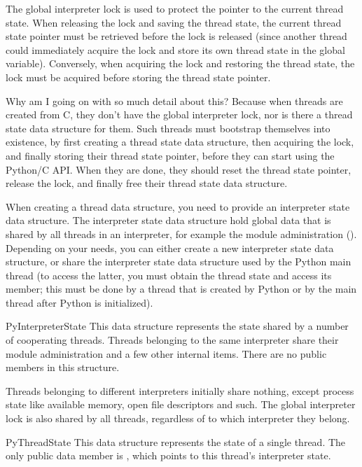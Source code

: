 \documentclass{manual}
\begin{document}
The global interpreter lock is used to protect the pointer to the
current thread state.  When releasing the lock and saving the thread
state, the current thread state pointer must be retrieved before the
lock is released (since another thread could immediately acquire the
lock and store its own thread state in the global variable).
Conversely, when acquiring the lock and restoring the thread state,
the lock must be acquired before storing the thread state pointer.

Why am I going on with so much detail about this?  Because when
threads are created from C, they don't have the global interpreter
lock, nor is there a thread state data structure for them.  Such
threads must bootstrap themselves into existence, by first creating a
thread state data structure, then acquiring the lock, and finally
storing their thread state pointer, before they can start using the
Python/C API.  When they are done, they should reset the thread state
pointer, release the lock, and finally free their thread state data
structure.

When creating a thread data structure, you need to provide an
interpreter state data structure.  The interpreter state data
structure hold global data that is shared by all threads in an
interpreter, for example the module administration
().  Depending on your needs, you can either create
a new interpreter state data structure, or share the interpreter state
data structure used by the Python main thread (to access the latter,
you must obtain the thread state and access its  member;
this must be done by a thread that is created by Python or by the main
thread after Python is initialized).


\begin{ctypedesc}{PyInterpreterState}
This data structure represents the state shared by a number of
cooperating threads.  Threads belonging to the same interpreter
share their module administration and a few other internal items.
There are no public members in this structure.

Threads belonging to different interpreters initially share nothing,
except process state like available memory, open file descriptors and
such.  The global interpreter lock is also shared by all threads,
regardless of to which interpreter they belong.
\end{ctypedesc}

\begin{ctypedesc}{PyThreadState}
This data structure represents the state of a single thread.  The only
public data member is ,
which points to this thread's interpreter state.
\end{ctypedesc}
\end{document}

